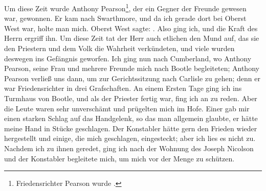 Um diese Zeit wurde Anthony 
Pearson\footnote{Friedensrichter Pearson wurde .}, der ein Gegner der
Freunde gewesen war, gewonnen. Er kam nach Swarthmore,
und da ich gerade dort bei Oberst West war, holte man mich.
Oberst West sagte: . Also ging ich, und die Kraft des
Herrn ergriff ihn.
Um diese Zeit tat der Herr auch etlichen den Mund auf,
das sie den Priestern und dem Volk die Wahrheit verkündeten,
und viele wurden deswegen ins Gefängnis geworfen. Ich ging
nun nach Cumberland, wo Anthony Pearson, 
seine Frau und
mehrere Freunde mich nach Bootle begleiteten; 
Anthony Pearson
verließ uns dann, um zur Gerichtssitzung nach Carlisle zu gehen;
denn er war Friedensrichter in drei Grafschaften. An einem
Ersten Tage ging ich ins Turmhaus von Bootle, und als der
Priester fertig war, fing ich an zu reden. Aber die Leute waren
sehr unverschämt und prügelten mich im Hofe. Einer gab mir
einen starken Schlag auf das Handgelenk, so das man allgemein
glaubte, er hätte meine Hand in Stücke geschlagen. Der 
Konstabler hätte gern den Frieden wieder hergestellt und einige, die
mich geschlagen, eingesteckt; aber ich lies es nicht zu. Nachdem
ich zu ihnen geredet, ging ich nach der Wohnung des Joseph
Nicolson und der Konstabler 
begleitete mich, um mich vor der
Menge zu schützen.


